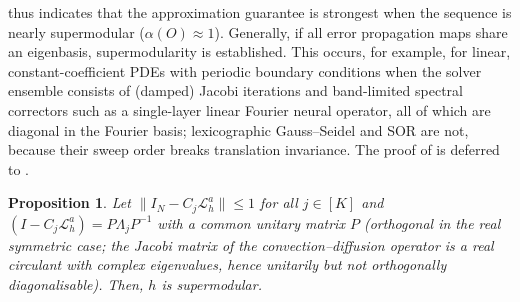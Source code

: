 \documentclass{article}
\newcommand{\edit}[1]{{\color{red}#1}}
\newtheorem{proposition}[theorem]{Proposition}
\begin{document}

 thus indicates that the approximation guarantee is strongest when the sequence is nearly supermodular ($\alpha(O) \approx 1$). Generally, if all error propagation maps share an eigenbasis,
supermodularity is established.
\edit{This occurs, for example, for linear, constant-coefficient PDEs with periodic boundary conditions when the solver ensemble consists of (damped) Jacobi iterations and band-limited spectral correctors such as a single-layer linear Fourier neural operator, all of which are diagonal in the Fourier basis; lexicographic Gauss--Seidel and SOR are not, because their sweep order breaks translation invariance.} 
The proof of  is deferred to .
\begin{proposition} \label{th:simultaneoussupermodular}
    Let $\|I_N - C_j\mathcal{L}_h^a\| \leq 1$ for all $j \in [K]$ and $\left(I - C_j \mathcal{L}_{h}^a\right) = P\Lambda_jP^{-1}$ \edit{with a common unitary matrix $P$ (orthogonal in the real symmetric case; the Jacobi matrix of the convection--diffusion operator is a real circulant with complex eigenvalues, hence unitarily but not orthogonally diagonalisable)}. Then, $h$ is supermodular. 
\end{proposition}
\end{document}
